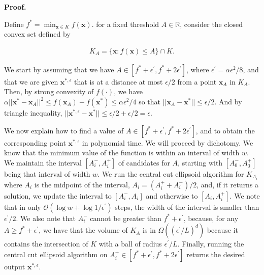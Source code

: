 \documentclass[10pt,a4paper]{article}
\begin{document}



\par\medskip\noindent\textbf{Proof.}\par




Define $f^{*}=\min_{{\boldsymbol{x}}\in K}f({\boldsymbol{x}})$. for a fixed threshold $A\in\mathbb{R}$, consider the closed convex set defined by\par


\[\begin{gathered}
K_{A}=\{{\boldsymbol{x}}\colon f({\boldsymbol{x}})\leq A\}\cap K.
\end{gathered}\]


We start by assuming that we have $A\in[f^{*}+\epsilon^{\prime},f^{*}+2\epsilon^{\prime}]$, where $\epsilon^{\prime}=\alpha\epsilon^{2}/8$, and that we are given ${\boldsymbol{x}}^{*,\epsilon}$ that is at a distance at most $\epsilon/2$ from a point ${\boldsymbol{x}}_{A}$ in $K_{A}$. Then, by strong convexity of $f(\cdot)$, we have $\alpha||{\boldsymbol{x}}^{*}-{\boldsymbol{x}}_{A}||^{2}\leq f({\boldsymbol{x}}_{A})-f({\boldsymbol{x}}^{*})\leq\alpha\epsilon^{2}/4$ so that $||{\boldsymbol{x}}_{A}-{\boldsymbol{x}}^{*}||\leq\epsilon/2$. And by triangle inequality, $||{\boldsymbol{x}}^{*,\epsilon}-{\boldsymbol{x}}^{*}||\leq\epsilon/2+\epsilon/2=\epsilon$.\par




We now explain how to find a value of $A\in[f^{*}+\epsilon^{\prime},f^{*}+2\epsilon^{\prime}]$, and to obtain the corresponding point ${\boldsymbol{x}}^{*,\epsilon}$ in polynomial time. We will proceed by dichotomy. We know that the minimum value of the function is within an interval of width $w$. We maintain the interval $[A^{-}_{i},A^{+}_{i}]$ of candidates for $A$, starting with $[A_{0}^{-},A_{0}^{+}]$ being that interval of width $w$. We run the central cut ellipsoid algorithm for $K_{A_{i}}$ where $A_{i}$ is the midpoint of the interval, $A_{i}=(A_{i}^{+}+A_{i}^{-})/2$, and, if it returns a solution, we update the interval to $[A_{i}^{-},A_{i}]$ and otherwise to $[A_{i},A_{i}^{+}]$. We note that in only $\mathcal{O}(\log w+\log 1/\epsilon^{\prime})$
steps, the width of the interval is smaller than $\epsilon^{\prime}/2$. We also note that $A_{i}^{-}$ cannot be greater than $f^{*}+\epsilon^{\prime}$, because, for any $A\geq f^{*}+\epsilon^{\prime}$, we have that the volume of $K_{A}$ is in $\Omega((\epsilon^{\prime}/L)^{d})$ because it contains the intersection of $K$ with a ball of radius $\epsilon^{\prime}/L$. Finally, running the central cut ellipsoid algorithm on $A_{i}^{+}\in[f^{*}+\epsilon^{\prime},f^{*}+2\epsilon^{\prime}]$ returns the desired output ${\boldsymbol{x}}^{*,\epsilon}$.\par
\end{document}
